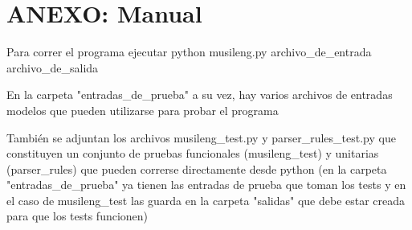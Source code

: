 \section{ANEXO: Manual}

Para correr el programa ejecutar python musileng.py archivo\_de\_entrada archivo\_de\_salida

En la carpeta "entradas\_de\_prueba" a su vez, hay varios archivos de entradas modelos que pueden utilizarse para probar el programa

También se adjuntan los archivos musileng\_test.py y parser\_rules\_test.py que constituyen un conjunto de pruebas funcionales (musileng\_test) y unitarias (parser\_rules) que pueden correrse directamente desde python (en la carpeta "entradas\_de\_prueba" ya tienen las entradas de prueba que toman los tests y en el caso de musileng\_test las guarda en la carpeta "salidas" que debe estar creada para que los tests funcionen)